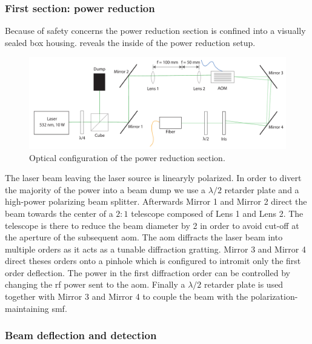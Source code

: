 \subsubsection{First section: power reduction}\label{subsec:setup_power_reduction}

Because of safety concerns the power reduction section is confined into a
visually sealed box housing.  reveals the
inside of the power reduction setup.
\begin{figure}[htb]
  \centering
  \includegraphics[width=\textwidth]{../figure/setup/power-reduction.pdf}
  \caption{Optical configuration of the power reduction section.
  }\label{fig:setup_power_reduction}
\end{figure}
The laser beam leaving the laser source is linearyly polarized. In order to
divert the majority of the power into a beam dump we use a $\lambda/2$
retarder plate and a high-power polarizing beam splitter. Afterwards Mirror
\num{1} and Mirror \num{2} direct the beam towards the center of a $2:1$
telescope composed of Lens \num{1} and Lens \num{2}. The telescope is there to
reduce the beam diameter by \num{2} in order to avoid cut-off at the aperture
of the subsequent \gls{aom}. The \gls{aom} diffracts the laser beam into
multiple orders as it acts as a tunable diffraction gratting. Mirror \num{3}
and Mirror \num{4} direct theses orders onto a pinhole which is configured to
intromit only the first order deflection. The power in the first diffraction
order can be controlled by changing the \gls{rf} power sent to the \gls{aom}.
Finally a $\lambda/2$ retarder plate is used together with Mirror \num{3} and
Mirror \num{4} to couple the beam with the polarization-maintaining \gls{smf}.

\subsubsection{Beam deflection and detection}\label{subsec:setup_deflection_detection}

